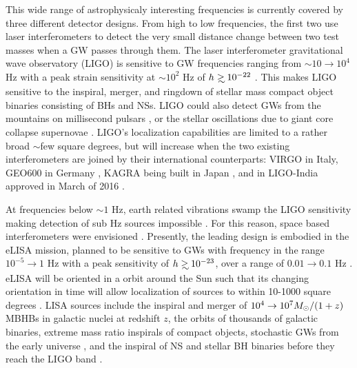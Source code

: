 This wide range of astrophysicaly interesting frequencies is currently covered
by three different detector designs. From high to low frequencies, the first
two use laser interferometers to detect the very small distance change between
two test masses when a GW passes through them. The laser interferometer
gravitational wave observatory (LIGO) is sensitive to GW frequencies ranging
from $\sim 10 \rightarrow 10^4$ Hz with a peak strain sensitivity at
$\sim10^{2}$ Hz of $h \gsim 10^{-22}$ \citep{aLIGO:2015}. This makes LIGO
sensitive to the inspiral, merger, and ringdown of stellar mass compact object
binaries consisting of BHs and NSs. LIGO could also detect GWs from the
mountains on millisecond pulsars \citep[\emph{e.g.}][and references therein]{ContWaveLIGO:2016}, 
or the stellar oscillations due to giant core
collapse supernovae \citep[\emph{e.g.}][and references therein]{SNLIGO:2016}.
LIGO's localization capabilities are limited to a rather broad $\sim$few
square degrees, but will increase when the two existing interferometers are
joined by their international counterparts: VIRGO \citep{Acernese:2015} in
Italy, GEO600 in Germany \citep{Dooley:2015}, KAGRA being built in Japan
\citep{Tomaru:2016}, and in LIGO-India approved in March of 2016 \citep{LIGOIndia}.

At frequencies below $\sim 1$ Hz, earth related vibrations swamp the LIGO
sensitivity making detection of sub Hz sources impossible \citep{aLIGO:2015}.
For this reason, space based interferometers were envisioned
\citep{ThorneBraginsky:1976}. Presently, the leading design is embodied in
the eLISA mission, planned to be sensitive to GWs with frequency in the range
$10^{-5} \rightarrow 1$ Hz with a peak sensitivity of $h \gsim 10^{-23}$, over
a range of $0.01 \rightarrow 0.1$ Hz \citep{eLISA:AmaroSeoane:2013}. eLISA
will be oriented in a orbit around the Sun such that its changing orientation
in time will allow localization of sources to within 10-1000 square degrees
\citep{eLISA:AmaroSeoane:2013}. LISA sources include the inspiral and merger
of $10^4 \rightarrow 10^7 {M_{\odot}}/(1+z)$ MBHBs in galactic nuclei at redshift
$z$, the orbits of thousands of galactic binaries, extreme mass ratio inspirals
of compact objects, stochastic GWs from the early universe \citep{eLISA:AmaroSeoane:2013}, and the inspiral of NS and stellar BH binaries before they reach the LIGO band \citep[\emph{e.g.}][and references therein]{Sesana:LISALIGO:2016}.

